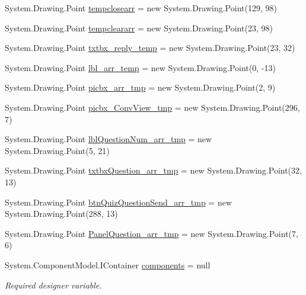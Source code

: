 \begin{DoxyCompactItemize}
\item 
\-System.\-Drawing.\-Point \hyperlink{class_sr_p___classroom_inq_1_1frm_classrrom_inq_a6ad2bdb537cfc35b174dd16dd8e03904}{tempclosearr} = new \-System.\-Drawing.\-Point(129, 98)
\item 
\-System.\-Drawing.\-Point \hyperlink{class_sr_p___classroom_inq_1_1frm_classrrom_inq_a189c01a3745fca62a8250be6a3517894}{tempcleararr} = new \-System.\-Drawing.\-Point(23, 98)
\item 
\-System.\-Drawing.\-Point \hyperlink{class_sr_p___classroom_inq_1_1frm_classrrom_inq_a0b175596cb83997b38795ee916c978f1}{txtbx\-\_\-reply\-\_\-temp} = new \-System.\-Drawing.\-Point(23, 32)
\item 
\-System.\-Drawing.\-Point \hyperlink{class_sr_p___classroom_inq_1_1frm_classrrom_inq_ae3405b23105270490b9685ac52e1b574}{lbl\-\_\-arr\-\_\-temp} = new \-System.\-Drawing.\-Point(0, -\/13)
\item 
\-System.\-Drawing.\-Point \hyperlink{class_sr_p___classroom_inq_1_1frm_classrrom_inq_a019be294be5d02bea4369298d2a135db}{picbx\-\_\-arr\-\_\-tmp} = new \-System.\-Drawing.\-Point(2, 9)
\item 
\-System.\-Drawing.\-Point \hyperlink{class_sr_p___classroom_inq_1_1frm_classrrom_inq_ae49fd425a3c4f52d94af6c20b67f6126}{picbx\-\_\-\-Conv\-View\-\_\-tmp} = new \-System.\-Drawing.\-Point(296, 7)
\item 
\-System.\-Drawing.\-Point \hyperlink{class_sr_p___classroom_inq_1_1frm_classrrom_inq_a9af0d3cc5171be1c8b01ea1e208d61ee}{lbl\-Question\-Num\-\_\-arr\-\_\-tmp} = new \-System.\-Drawing.\-Point(5, 21)
\item 
\-System.\-Drawing.\-Point \hyperlink{class_sr_p___classroom_inq_1_1frm_classrrom_inq_a09f25b6934ed463e8b781498b5511796}{txtbx\-Question\-\_\-arr\-\_\-tmp} = new \-System.\-Drawing.\-Point(32, 13)
\item 
\-System.\-Drawing.\-Point \hyperlink{class_sr_p___classroom_inq_1_1frm_classrrom_inq_a8dcbe5ae5d44d445994571c17345e756}{btn\-Quiz\-Question\-Send\-\_\-arr\-\_\-tmp} = new \-System.\-Drawing.\-Point(288, 13)
\item 
\-System.\-Drawing.\-Point \hyperlink{class_sr_p___classroom_inq_1_1frm_classrrom_inq_a3e546b9b0c603a788d0316efe572c960}{\-Panel\-Question\-\_\-arr\-\_\-tmp} = new \-System.\-Drawing.\-Point(7, 6)
\item 
\-System.\-Component\-Model.\-I\-Container \hyperlink{class_sr_p___classroom_inq_1_1frm_classrrom_inq_a9ae295b3d0621cd5e50bcf8a475c0686}{components} = null
\begin{DoxyCompactList}\small\item\em \-Required designer variable. \end{DoxyCompactList}\item 

\end{DoxyCompactItemize}
